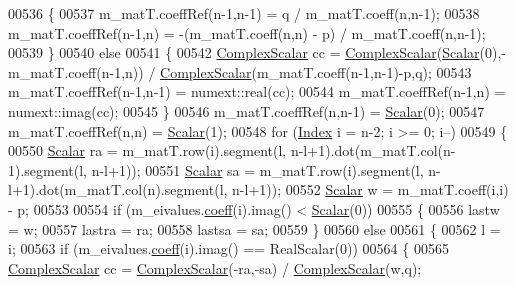 \begin{DoxyCode}
00536       \{
00537         m\_matT.coeffRef(n-1,n-1) = q / m\_matT.coeff(n,n-1);
00538         m\_matT.coeffRef(n-1,n) = -(m\_matT.coeff(n,n) - p) / m\_matT.coeff(n,n-1);
00539       \}
00540       \textcolor{keywordflow}{else}
00541       \{
00542         \hyperlink{group___eigenvalues___module_a4d0b2a773357d0a6ec98e026f04002ed}{ComplexScalar} cc = \hyperlink{group___eigenvalues___module_a4d0b2a773357d0a6ec98e026f04002ed}{ComplexScalar}(\hyperlink{group___eigenvalues___module_a017d49fe0d59874b70a2fcf35e5aa373}{Scalar}(0),-m\_matT.coeff(n-1,n)) / 
      \hyperlink{group___eigenvalues___module_a4d0b2a773357d0a6ec98e026f04002ed}{ComplexScalar}(m\_matT.coeff(n-1,n-1)-p,q);
00543         m\_matT.coeffRef(n-1,n-1) = numext::real(cc);
00544         m\_matT.coeffRef(n-1,n) = numext::imag(cc);
00545       \}
00546       m\_matT.coeffRef(n,n-1) = \hyperlink{group___eigenvalues___module_a017d49fe0d59874b70a2fcf35e5aa373}{Scalar}(0);
00547       m\_matT.coeffRef(n,n) = \hyperlink{group___eigenvalues___module_a017d49fe0d59874b70a2fcf35e5aa373}{Scalar}(1);
00548       \textcolor{keywordflow}{for} (\hyperlink{group___eigenvalues___module_a5bff6a6bc0efac67d52c60c2c3deb9ee}{Index} i = n-2; i >= 0; i--)
00549       \{
00550         \hyperlink{group___eigenvalues___module_a017d49fe0d59874b70a2fcf35e5aa373}{Scalar} ra = m\_matT.row(i).segment(l, n-l+1).dot(m\_matT.col(n-1).segment(l, n-l+1));
00551         \hyperlink{group___eigenvalues___module_a017d49fe0d59874b70a2fcf35e5aa373}{Scalar} sa = m\_matT.row(i).segment(l, n-l+1).dot(m\_matT.col(n).segment(l, n-l+1));
00552         \hyperlink{group___eigenvalues___module_a017d49fe0d59874b70a2fcf35e5aa373}{Scalar} w = m\_matT.coeff(i,i) - p;
00553 
00554         \textcolor{keywordflow}{if} (m\_eivalues.\hyperlink{class_eigen_1_1_plain_object_base_afbfc12954f16d21aedb7bd839f64a278}{coeff}(i).imag() < \hyperlink{group___eigenvalues___module_a017d49fe0d59874b70a2fcf35e5aa373}{Scalar}(0))
00555         \{
00556           lastw = w;
00557           lastra = ra;
00558           lastsa = sa;
00559         \}
00560         \textcolor{keywordflow}{else}
00561         \{
00562           l = i;
00563           \textcolor{keywordflow}{if} (m\_eivalues.\hyperlink{class_eigen_1_1_plain_object_base_afbfc12954f16d21aedb7bd839f64a278}{coeff}(i).imag() == RealScalar(0))
00564           \{
00565             \hyperlink{group___eigenvalues___module_a4d0b2a773357d0a6ec98e026f04002ed}{ComplexScalar} cc = \hyperlink{group___eigenvalues___module_a4d0b2a773357d0a6ec98e026f04002ed}{ComplexScalar}(-ra,-sa) / 
      \hyperlink{group___eigenvalues___module_a4d0b2a773357d0a6ec98e026f04002ed}{ComplexScalar}(w,q);

\end{DoxyCode}

